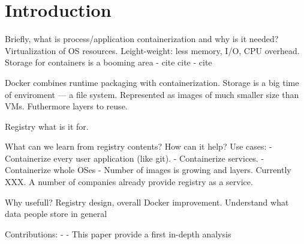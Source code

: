 \section{Introduction}


Briefly, what is process/application containerization and why is it needed?
%
Virtualization of OS resources.
%
Leight-weight: less memory, I/O, CPU overhead.
%
Storage for containers is a booming area - cite cite - cite


Docker combines runtime packaging with containerization.
%
Storage is a big time of enviroment --- a file system.
%
Represented as images of much smaller size than VMs.
%
Futhermore layers to reuse.


%
Registry what is it for. 
%




%
What can we learn from registry contents? How can it help?
%
Use cases: 
- Containerize every user application (like git).
- Containerize services.
- Containerize whole OSes - 
%
Number of images is growing and layers. Currently XXX.
%
A number of companies already provide registry as a service.

Why usefull?  Registry design, overall Docker improvement.
Understand what data people store in general

Contributions:
 -
 - This paper provide a first in-depth analysis
